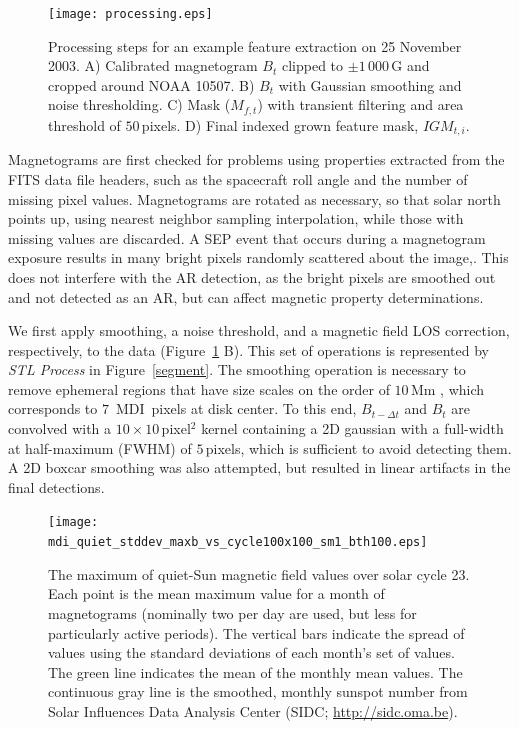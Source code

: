 \begin{figure}[!t]
\centerline{\texttt{[image: processing.eps]}}
\caption[Example SMART image processing steps.]{Processing steps for an example feature extraction on 25 November 2003. A) Calibrated magnetogram $B_{t}$ clipped to $\pm$$1\,000$\,G and cropped around NOAA 10507. B) $B_{t}$ with Gaussian smoothing and noise thresholding. C) Mask ($M_{f,t}$) with transient filtering and area threshold of $50$\,pixels. D) Final indexed grown feature mask, $IGM_{t,i}$.}
\label{processing}
\end{figure}

Magnetograms are first checked for problems using properties extracted from the \gls{FITS} data file headers, such as the spacecraft roll angle and the number of missing pixel values. Magnetograms are rotated as necessary, so that solar north points up, using nearest neighbor sampling interpolation, while those with missing values are discarded. A \gls{SEP} event that occurs during a magnetogram exposure results in many bright pixels randomly scattered about the image,. This does not interfere with the \gls{AR} detection, as the bright pixels are smoothed out and not detected as an AR, but can affect magnetic property determinations. %

We first apply smoothing, a noise threshold, and a magnetic field \gls{LOS} correction, respectively, to the data (Figure~\ref{processing} B). This set of operations is represented by \emph{STL Process} in Figure~\ref{segment}. The smoothing operation is necessary to remove ephemeral regions that have size scales on the order of $10$\,Mm \citep{Hagenaar:2001}, which corresponds to $7$~MDI~pixels at disk center.
To this end, $B_{t-\Delta t}$ and $B_{t}$ are convolved with a $10\times 10$\,pixel$^2$ kernel containing a 2D gaussian with a full-width at half-maximum (FWHM) of $5$\,pixels, which is sufficient to avoid detecting them. A 2D boxcar smoothing was also attempted, but resulted in linear artifacts in the final detections.

\begin{figure}[!t]
\centerline{\texttt{[image: mdi\_quiet\_stddev\_maxb\_vs\_cycle100x100\_sm1\_bth100.eps]}}
\caption[Maximum QS magnetic field over the solar cycle.]{The maximum of quiet-Sun magnetic field values over solar cycle 23. Each point is the mean maximum value for a month of magnetograms (nominally two per day are used, but less for particularly active periods). The vertical bars indicate the spread of values using the standard deviations of each month's set of values. The green line indicates the mean of the monthly mean values. The continuous gray line is the smoothed, monthly sunspot number from Solar Influences Data Analysis Center (SIDC; \url{http://sidc.oma.be}).}
\label{cycle_sig}
\end{figure}


